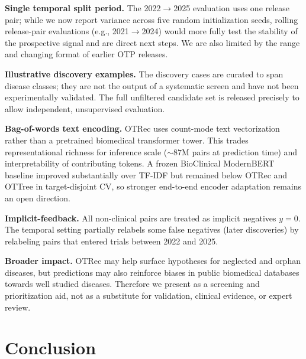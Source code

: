 \documentclass{article}
\begin{document}
\textbf{Single temporal split period.}
The 2022$\to$2025 evaluation uses one release pair; while we now report
variance across five random initialization seeds, rolling release-pair
evaluations (e.g., 2021$\to$2024) would more fully test the stability of
the prospective signal and are direct next steps. We are also limited by the range and changing format of earlier OTP  releases.

\textbf{Illustrative discovery examples.}
The discovery cases are curated to span disease classes; they
are not the output of a systematic screen and have not been
experimentally validated. The full unfiltered candidate set is
released precisely to allow independent, unsupervised evaluation.

\textbf{Bag-of-words text encoding.}
OTRec uses count-mode text vectorization rather than a
pretrained biomedical transformer tower. This trades representational
richness for inference scale (${\sim}87$M pairs at prediction time) and
interpretability of contributing tokens. A frozen BioClinical ModernBERT baseline improved substantially over TF-IDF but remained below OTRec and OTTree in target-disjoint CV, so stronger end-to-end encoder adaptation remains an open direction.

\textbf{Implicit-feedback.}
All non-clinical pairs are treated as implicit negatives $y{=}0$. The temporal setting partially relabels some false negatives (later discoveries) by relabeling pairs that entered trials between 2022 and 2025. %

\textbf{Broader impact.} OTRec may help surface hypotheses for neglected and orphan diseases, but predictions may also reinforce biases in public biomedical databases towards well studied diseases. Therefore we present as a screening and prioritization aid, not as a substitute for validation, clinical evidence, or expert review.


\section{Conclusion}
\end{document}
